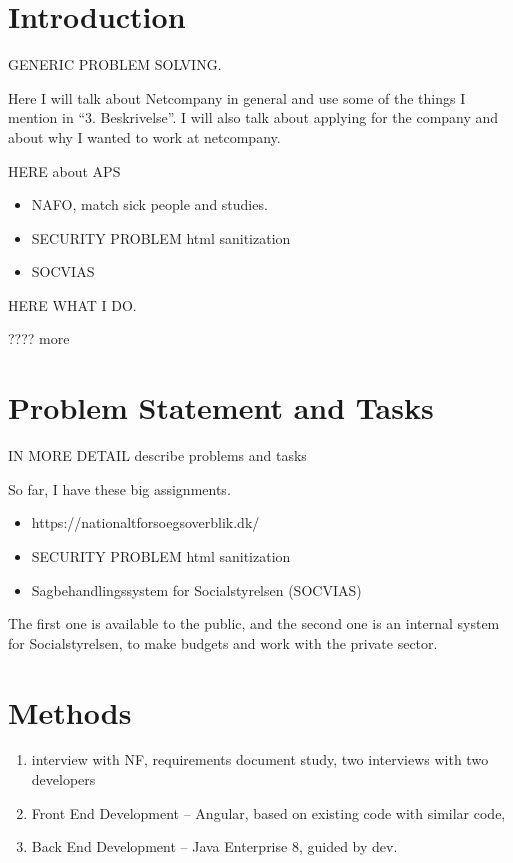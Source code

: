 \documentclass[../main.tex]{subfiles}
\begin{document}
\section{Introduction}

GENERIC PROBLEM SOLVING.  

Here I will talk about Netcompany in general and use some of the things I mention in “3. Beskrivelse”. I will also talk about applying for the company and about why I wanted to work at netcompany.  

HERE about APS 

\begin{itemize}
    \item NAFO, match sick people and studies. 
    \item SECURITY PROBLEM html sanitization 
    \item SOCVIAS 
\end{itemize}
HERE WHAT I DO. 


    ???? more 
\section{Problem Statement and Tasks}

IN MORE DETAIL describe problems and tasks 

So far, I have these big assignments. 

\begin{itemize}
    \item  https://nationaltforsoegsoverblik.dk/ 
    \item SECURITY PROBLEM html sanitization 
    \item Sagbehandlingssystem for Socialstyrelsen (SOCVIAS) 
\end{itemize}

The first one is available to the public, and the second one is an internal system for Socialstyrelsen, to make budgets and work with the private sector. 

\section{Methods}

\begin{enumerate}
\item interview with NF, requirements document study, two interviews with two developers 
\item Front End Development – Angular, based on existing code with similar code,  
\item Back End Development – Java Enterprise 8, guided by dev. 
\end{enumerate}
\end{document}
